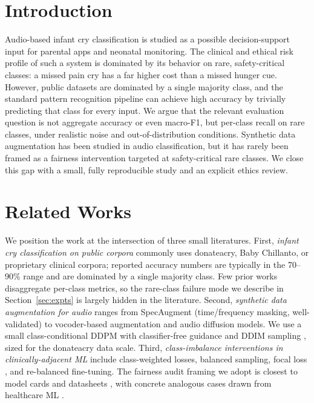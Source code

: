 \documentclass[final]{article}
\begin{document}
\section{Introduction}\label{sec:intro}
Audio-based infant cry classification is studied as a possible decision-support input for parental apps and neonatal monitoring. The clinical and ethical risk profile of such a system is dominated by its behavior on rare, safety-critical classes: a missed pain cry has a far higher cost than a missed hunger cue. However, public datasets are dominated by a single majority class, and the standard pattern recognition pipeline can achieve high accuracy by trivially predicting that class for every input. We argue that the relevant evaluation question is not aggregate accuracy or even macro-F1, but per-class recall on rare classes, under realistic noise and out-of-distribution conditions. Synthetic data augmentation has been studied in audio classification, but it has rarely been framed as a fairness intervention targeted at safety-critical rare classes. We close this gap with a small, fully reproducible study and an explicit ethics review.

\section{Related Works}\label{sec:past}
We position the work at the intersection of three small literatures. First, \emph{infant cry classification on public corpora} commonly uses donateacry, Baby Chillanto, or proprietary clinical corpora; reported accuracy numbers are typically in the 70--90\% range and are dominated by a single majority class. Few prior works disaggregate per-class metrics, so the rare-class failure mode we describe in Section~\ref{sec:expts} is largely hidden in the literature. Second, \emph{synthetic data augmentation for audio} ranges from SpecAugment \cite{park2019specaugment} (time/frequency masking, well-validated) to vocoder-based augmentation and audio diffusion models. We use a small class-conditional DDPM \cite{ho2020denoising} with classifier-free guidance \cite{ho2021classifier} and DDIM sampling \cite{song2021ddim}, sized for the donateacry data scale. Third, \emph{class-imbalance interventions in clinically-adjacent ML} include class-weighted losses, balanced sampling, focal loss \cite{lin2017focal}, and re-balanced fine-tuning. The fairness audit framing we adopt is closest to model cards \cite{mitchell2019model} and datasheets \cite{gebru2021datasheets}, with concrete analogous cases drawn from healthcare ML \cite{obermeyer2019dissecting,sjoding2020racial}.
\end{document}
